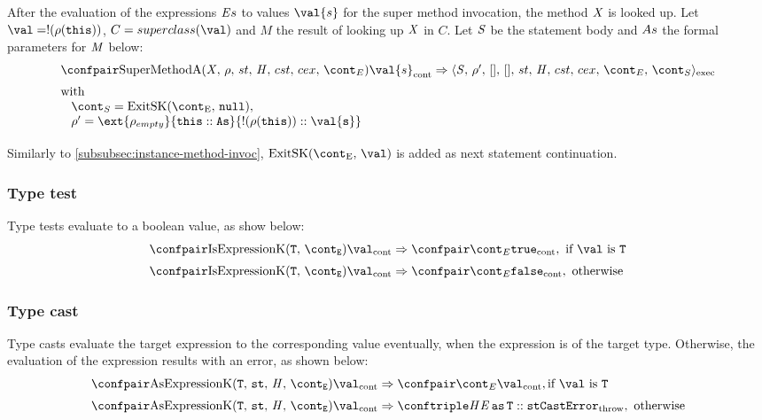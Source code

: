 \documentclass{article}
\newcommand{\cesktrans}[2]{\ensuremath{{#1} \Rightarrow {#2}}}
\begin{document}
After the evaluation of the expressions $\mathit{E}{s}$ to values $\val{s}$ for the super method invocation, the method $\mathit{X}$ is looked up.
Let $\val = \deref{(\env(\this))}$, $C = \superclass{\val}$ and $M$ the result of looking up $\mathit{X}$ in $C$.
Let $\mathit{S}$ be the statement body and $As$ the formal parameters for $\mathit{M}$ below:
\[
  \begin{array}{lcl}
	\cesktrans{
		\contconf{\SuperMethodA}{\val{s}}}{
		\execconf{\stmt}{\env'}{[]}{[]}{\handler}{\cstrace}{\cex}{\econt}{\scont}}
	\\[2mm]
	\textrm{with }\\
	\hspace{3mm}\scont = \ExitSK{\tt{null}},\\
	\hspace{3mm}\env' = \ext{\env_{empty}}{\this :: \formals}{\deref{(\env(\this))} :: \val{s}}\\[2mm]
  \end{array}
\]
Similarly to \ref{subsubsec:instance-method-invoc}, $\ExitSK{\val}$ is added as next statement continuation.

\subsubsection{Type test}
\label{subsubsec:type-test}
Type tests evaluate to a boolean value, as show below:
\[
  \begin{array}{lcl}
	\cesktrans{
		\contconf{\IsExpressionK}{\val}}{
		\contconf{\econt}{\true}},
		\textrm{ if }\val \textrm{ is } \tt{T}\\[2mm]

	\cesktrans{
		\contconf{\IsExpressionK}{\val}}{
		\contconf{\econt}{\false}}, \textrm{ otherwise}
  \end{array}
\]

\subsubsection{Type cast}
\label{subsubsec:type-cast}
Type casts evaluate the target expression to the corresponding value eventually, when the expression is of the target type.
Otherwise, the evaluation of the expression results with an error, as shown below:
\[
  \begin{array}{lcl}
	\cesktrans{
		\contconf{\AsExpressionK}{\val}}{
		\contconf{\econt}{\val}}, \textrm{if }\val \textrm{ is } \tt{T}\\[2mm]

	\cesktrans{
		\contconf{\AsExpressionK}{\val}}{
		\throwconf{\handler}{\AsExpression{\expressionmeta}{\tt{T}} :: \strace}{\tt{CastError}}}, \textrm{ otherwise}
    \end{array}
\]
\end{document}
